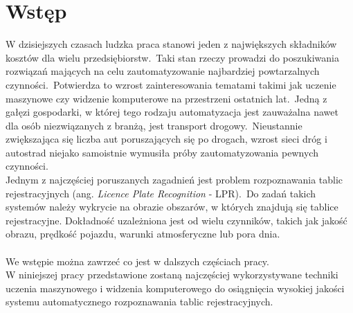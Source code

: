 %


\chapter*{Wstęp}

%
%

W dzisiejszych czasach ludzka praca stanowi jeden z największych składników kosztów dla wielu przedsiębiorstw.\ Taki stan rzeczy prowadzi do poszukiwania rozwiązań mających na celu zautomatyzowanie najbardziej powtarzalnych czynności.\ Potwierdza to wzrost zainteresowania tematami takimi jak uczenie maszynowe czy widzenie komputerowe na przestrzeni ostatnich lat.\ Jedną z gałęzi gospodarki, w której tego rodzaju automatyzacja jest zauważalna nawet dla osób niezwiązanych z branżą, jest transport drogowy.\ Nieustannie zwiększająca się liczba aut poruszających się po drogach, wzrost sieci dróg i autostrad niejako samoistnie wymusiła próby zautomatyzowania pewnych czynności.\\

Jednym z najczęściej poruszanych zagadnień jest problem rozpoznawania tablic rejestracyjnych (ang. \textit{Licence Plate Recognition} - LPR).\ Do zadań takich systemów należy wykrycie na obrazie obszarów, w których znajdują się tablice rejestracyjne.
Dokładność uzależniona jest od wielu czynników, takich jak jakość obrazu, prędkość pojazdu, warunki atmosferyczne lub pora dnia.
\\\\We wstępie można zawrzeć co jest w dalszych częściach pracy.\\

W niniejszej pracy przedstawione zostaną najczęściej wykorzystywane techniki uczenia maszynowego i widzenia komputerowego do osiągnięcia wysokiej jakości systemu automatycznego rozpoznawania tablic rejestracyjnych.